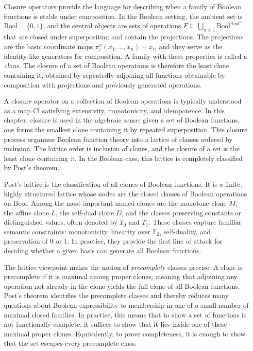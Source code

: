 Closure operators provide the language for describing when a family of Boolean functions is stable under composition. In the Boolean setting, the ambient set is \(\mathrm{Bool}=\{0,1\}\), and the central objects are sets of operations \(F\subseteq \bigcup_{n\ge 1}\mathrm{Bool}^{\mathrm{Bool}^n}\) that are closed under superposition and contain the projections. The projections are the basic coordinate maps \(\pi_i^n(x_1,\dots,x_n)=x_i\), and they serve as the identity-like generators for composition. A family with these properties is called a \emph{clone}. The closure of a set of Boolean operations is therefore the least clone containing it, obtained by repeatedly adjoining all functions obtainable by composition with projections and previously generated operations.

A closure operator on a collection of Boolean operations is typically understood as a map \(\mathrm{Cl}\) satisfying extensivity, monotonicity, and idempotence. In this chapter, closure is used in the algebraic sense: given a set of Boolean functions, one forms the smallest clone containing it by repeated superposition. This closure process organizes Boolean function theory into a lattice of classes ordered by inclusion. The lattice order is inclusion of clones, and the closure of a set is the least clone containing it. In the Boolean case, this lattice is completely classified by Post's theorem.

Post's lattice is the classification of all clones of Boolean functions. It is a finite, highly structured lattice whose nodes are the closed classes of Boolean operations on \(\mathrm{Bool}\). Among the most important named clones are the monotone clone \(M\), the affine clone \(L\), the self-dual clone \(D\), and the classes preserving constants or distinguished values, often denoted by \(T_0\) and \(T_1\). These classes capture familiar semantic constraints: monotonicity, linearity over \(\mathbb{F}_2\), self-duality, and preservation of \(0\) or \(1\). In practice, they provide the first line of attack for deciding whether a given basis can generate all Boolean functions.

The lattice viewpoint makes the notion of \emph{precomplete} classes precise. A clone is precomplete if it is maximal among proper clones, meaning that adjoining any operation not already in the clone yields the full clone of all Boolean functions. Post's theorem identifies the precomplete classes and thereby reduces many questions about Boolean expressibility to membership in one of a small number of maximal closed families. In practice, this means that to show a set of functions is not functionally complete, it suffices to show that it lies inside one of these maximal proper clones. Equivalently, to prove completeness, it is enough to show that the set escapes every precomplete class.

